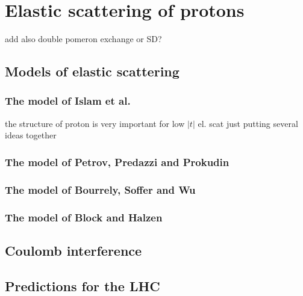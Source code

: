 \chapter{Elastic scattering of protons}

\> add also double pomeron exchange or SD?

\section{Models of elastic scattering}

\subsection{The model of Islam et al.}


\> the structure of proton is very important for low $|t|$ el. scat
\> just putting several ideas together

\subsection{The model of Petrov, Predazzi and Prokudin}


\subsection{The model of Bourrely, Soffer and Wu}


\subsection{The model of Block and Halzen}


\section{Coulomb interference}

\section{Predictions for the LHC}

